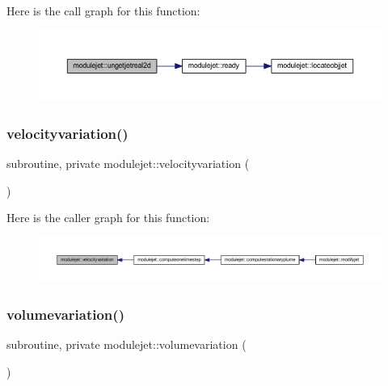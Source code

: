 Here is the call graph for this function\+:\nopagebreak
\begin{figure}[H]
\begin{center}
\leavevmode
\includegraphics[width=350pt]{namespacemodulejet_a3faa436f5c17dc03c594506d8e2e37ac_cgraph}
\end{center}
\end{figure}
\mbox{\label{namespacemodulejet_a4aaeebe926aea33dd1391746d2cdaa32}} 
\subsubsection{\texorpdfstring{velocityvariation()}{velocityvariation()}}
{\footnotesize\ttfamily subroutine, private modulejet\+::velocityvariation (\begin{DoxyParamCaption}{ }\end{DoxyParamCaption})\hspace{0.3cm}{\ttfamily [private]}}

Here is the caller graph for this function\+:\nopagebreak
\begin{figure}[H]
\begin{center}
\leavevmode
\includegraphics[width=350pt]{namespacemodulejet_a4aaeebe926aea33dd1391746d2cdaa32_icgraph}
\end{center}
\end{figure}
\mbox{\label{namespacemodulejet_abe8dc92537467b9dcd97c4a01b77f51c}} 
\subsubsection{\texorpdfstring{volumevariation()}{volumevariation()}}
{\footnotesize\ttfamily subroutine, private modulejet\+::volumevariation (\begin{DoxyParamCaption}{ }\end{DoxyParamCaption})\hspace{0.3cm}{\ttfamily [private]}}

